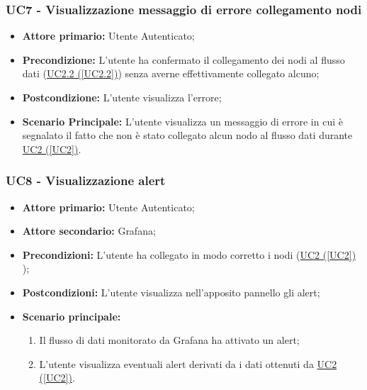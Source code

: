 \pagebreak

\subsubsection{UC7 - Visualizzazione messaggio di errore collegamento nodi}\label{UC7}
\begin{itemize}
\item \textbf{Attore primario:} Utente Autenticato;
\item \textbf{Precondizione:} L'utente ha confermato il collegamento dei nodi al flusso dati (\hyperref[UC2.2]{UC2.2 (\ref*{UC2.2})}) senza averne effettivamente collegato alcuno;
\item \textbf{Postcondizione:} L'utente visualizza l'errore;
\item \textbf{Scenario Principale:} L'utente visualizza un messaggio di errore in cui è segnalato il fatto che non è stato collegato alcun nodo al flusso dati durante \hyperref[UC2]{UC2 (\ref*{UC2})}.
\end{itemize}

\pagebreak

\subsubsection{UC8 - Visualizzazione alert}\label{UC8}
\begin{itemize}
	\item \textbf{Attore primario:} Utente Autenticato;
	\item \textbf{Attore secondario:} Grafana;
	\item \textbf{Precondizioni:} L'utente ha collegato in modo corretto i nodi (\hyperref[UC2]{UC2 (\ref*{UC2})} );
	\item \textbf{Postcondizioni:} L'utente visualizza nell'apposito pannello gli alert;
	\item \textbf{Scenario principale:}
	\begin{enumerate}
		\item Il flusso di dati monitorato da Grafana ha attivato un alert;
		\item L'utente visualizza eventuali alert derivati da i dati ottenuti da  \hyperref[UC2]{UC2 (\ref*{UC2})}.
	\end{enumerate}
\end{itemize}
